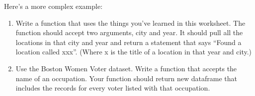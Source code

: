 \documentclass[
]{article}
\newenvironment{Shaded}{\begin{snugshade}}{\end{snugshade}}
\newcommand{\ControlFlowTok}[1]{\textcolor[rgb]{0.13,0.29,0.53}{\textbf{#1}}}
\newcommand{\DecValTok}[1]{\textcolor[rgb]{0.00,0.00,0.81}{#1}}
\newcommand{\FunctionTok}[1]{\textcolor[rgb]{0.00,0.00,0.00}{#1}}
\newcommand{\NormalTok}[1]{#1}
\newcommand{\OtherTok}[1]{\textcolor[rgb]{0.56,0.35,0.01}{#1}}
\newcommand{\SpecialCharTok}[1]{\textcolor[rgb]{0.00,0.00,0.00}{#1}}
\newcommand{\StringTok}[1]{\textcolor[rgb]{0.31,0.60,0.02}{#1}}
\begin{document}
\begin{quote}
\end{quote}

Here's a more complex example:

\begin{Shaded}
\end{Shaded}

\begin{enumerate}
\def\labelenumi{(\arabic{enumi})}
\setcounter{enumi}{23}
\item
  Write a function that uses the things you've learned in this
  worksheet. The function should accept two arguments, city and year. It
  should pull all the locations in that city and year and return a
  statement that says ``Found a location called xxx''. (Where x is the
  title of a location in that year and city.)
\item
  Use the Boston Women Voter dataset. Write a function that accepts the
  name of an occupation. Your function should return new dataframe that
  includes the records for every voter listed with that occupation.
\end{enumerate}
\end{document}
